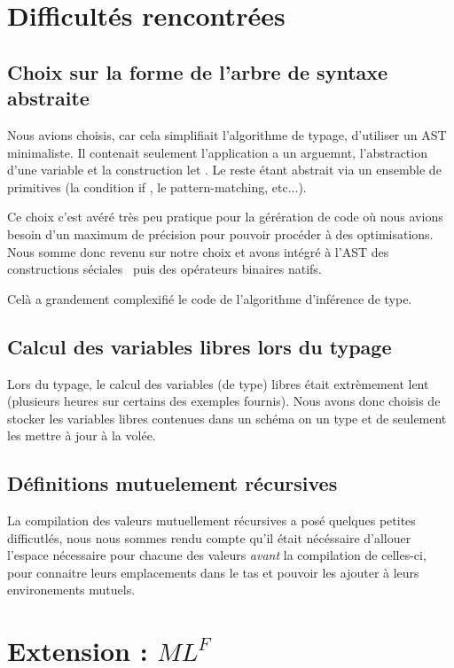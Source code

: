 \documentclass[a4paper]{article}
\def\mlf{$ML^F$}
\begin{document}
\section{Difficultés rencontrées}

\subsection{Choix sur la forme de l'arbre de syntaxe abstraite}
Nous avions choisis, car cela simplifiait l'algorithme de typage,
d'utiliser un AST minimaliste. Il contenait seulement l'application a
un arguemnt, l'abstraction d'une variable et la construction \og let
\fg. Le reste étant abstrait via un ensemble de primitives (la
condition \og if \fg, le pattern-matching, etc...).

Ce choix c'est avéré très peu pratique pour la gérération de code où
nous avions besoin d'un maximum de précision pour pouvoir procéder à
des optimisations. Nous somme donc revenu sur notre choix et avons
intégré à l'AST des \og constructions séciales \fg~puis des opérateurs
binaires natifs.

Celà a grandement complexifié le code de l'algorithme d'inférence de type.

\subsection{Calcul des variables libres lors du typage}

Lors du typage, le calcul des variables (de type) libres était
extrèmement lent (plusieurs heures sur certains des exemples fournis).
Nous avons donc choisis de stocker les variables libres contenues dans
un schéma on un type et de seulement les mettre à jour à la volée.


\subsection{Définitions mutuelement récursives}

La compilation des valeurs mutuellement récursives a posé quelques
petites difficutlés, nous nous sommes rendu compte qu'il était
nécéssaire d'allouer l'espace nécessaire pour chacune des valeurs
\emph{avant} la compilation de celles-ci, pour connaitre leurs
emplacements dans le tas et pouvoir les ajouter à leurs environements
mutuels.

\section{Extension : \mlf}\label{mlf}
\end{document}
